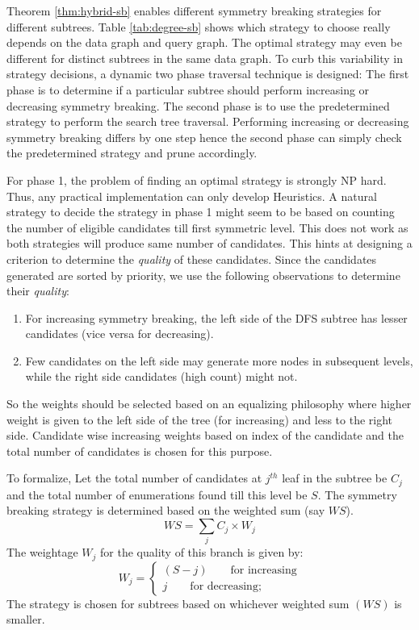 {Theorem \ref{thm:hybrid-sb} enables different symmetry breaking strategies for different subtrees. Table \ref{tab:degree-sb} shows which strategy to choose really depends on the data graph and query graph. The optimal strategy may even be different for distinct subtrees in the same data graph. To curb this variability in strategy decisions, a dynamic two phase traversal technique is designed:
The first phase is to determine if a particular subtree should perform increasing or decreasing symmetry breaking.
The second phase is to use the predetermined strategy to perform the search tree traversal.
Performing increasing or decreasing symmetry breaking differs by one step hence the second phase can simply check the predetermined strategy and prune accordingly.

For phase 1, the problem of finding an optimal strategy is strongly NP hard. Thus, any practical implementation can only develop Heuristics.
A natural strategy to decide the strategy in phase 1 might seem to be based on counting the number of eligible candidates till first symmetric level. This does not work as both strategies will produce same number of candidates.
This hints at designing a criterion to determine the \textit{quality} of these candidates.
Since the candidates generated are sorted by priority, we use the following observations to determine their \textit{quality}:
\begin{enumerate}[Obs1:]
    \item For increasing symmetry breaking, the left side of the DFS subtree has lesser candidates (vice versa for decreasing).
    \item Few candidates on the left side may generate more nodes in subsequent levels, while the right side candidates (high count) might not.
\end{enumerate}
So the weights should be selected based on an equalizing philosophy where higher weight is given to the left side of the tree (for increasing) and less to the right side.
Candidate wise increasing weights based on index of the candidate and the total number of candidates is chosen for this purpose.

To formalize, Let the total number of candidates at $j^{th}$ leaf in the subtree be $C_j$ and the total number of enumerations found till this level be $S$.
The symmetry breaking strategy is determined based on the weighted sum (say $WS$).
$$WS = \sum_j C_j\times W_j$$
The weightage $W_j$ for the quality of this branch is given by:
$$
    W_j=\begin{cases}
        (S - j) \qquad \text{for increasing} \\
        j \qquad \text{for decreasing};
    \end{cases}
$$
The strategy is chosen for subtrees based on whichever weighted sum $(WS)$ is smaller.

}
